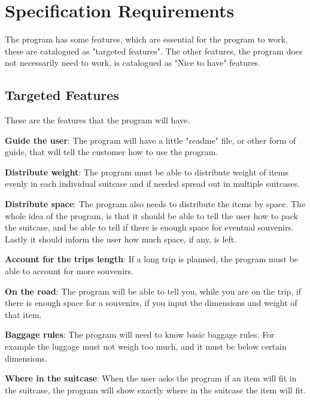 \section{Specification Requirements}
\label{sec:Spec}
The program has some features, which are essential for the program to work, these are catalogued as "targeted features". The other features, the program does not necessarily need to work, is catalogued as "Nice to have" features.
\newline

\subsection{Targeted Features}
These are the features that the program will have. 

\textbf{Guide the user}:
The program will have a little "readme" file, or other form of guide, that will tell the customer how to use the program.
\newline

\textbf{Distribute weight}:
The program must be able to distribute weight of items evenly in each individual suitcase and if needed spread out in multiple suitcases.
\newline

\textbf{Distribute space}:
The program also needs to distribute the items by space. The whole idea of the program, is that it should be able to tell the user how to pack the suitcase, and be able to tell if there is enough space for eventual souvenirs. Lastly it should inform the user how much space, if any, is left.
\newline

\textbf{Account for the trips length}:
If a long trip is planned, the program must be able to account for more souvenirs.
\newline

\textbf{On the road}:
The program will be able to tell you, while you are on the trip, if there is enough space for a souvenirs, if you input the dimensions and weight of that item.
\newline

\textbf{Baggage rules}:
The program will need to know basic baggage rules. For example the luggage must not weigh too much, and it must be below certain dimensions.
\newline

\textbf{Where in the suitcase}:
When the user asks the program if an item will fit in the suitcase, the program will show exactly where in the suitcase the item will fit.
\newline

